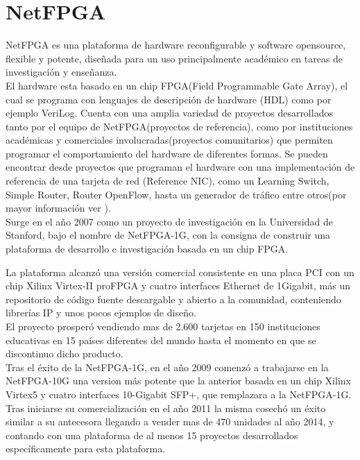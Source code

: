 \section{NetFPGA}
\label{section2.9}

NetFPGA\cite{NetFPGA1} es una plataforma de hardware reconfigurable y software opensource, flexible y potente, diseñada para un uso principalmente académico en tareas de investigación y enseñanza.\\

El hardware esta basado en un chip FPGA(Field Programmable Gate Array), el cual se programa con lenguajes de descripci\'on de hardware (HDL) como por ejemplo VeriLog. Cuenta con una amplia variedad de proyectos desarrollados tanto por el equipo de NetFPGA(proyectos de referencia), como por instituciones académicas y comerciales involucradas(proyectos comunitarios) que permiten programar el comportamiento del hardware  de diferentes formas. Se pueden encontrar desde proyectos que programan el hardware con una implementación de referencia de una tarjeta de red (Reference NIC), como un Learning Switch, Simple Router, Router OpenFlow, hasta un generador de tr\'afico entre otros(por mayor informaci\'on ver \citep{NetFPGA2}).\\ 

Surge en el año 2007 como un proyecto de investigación en la Universidad de Stanford, bajo el nombre de NetFPGA-1G, con la consigna de construir una plataforma de desarrollo e investigación basada en un chip FPGA.
 
La plataforma alcanz\'o una versi\'on comercial consistente en una placa PCI con un chip Xilinx Virtex-II proFPGA y cuatro interfaces Ethernet de 1Gigabit, m\'as un repositorio de código fuente descargable y abierto a la comunidad, conteniendo librerías IP y unos pocos ejemplos de diseño.\\

El proyecto prosper\'o vendiendo mas de 2.600 tarjetas en 150 instituciones educativas en 15 países diferentes del mundo hasta el momento en que se discontinuo dicho producto.\\

Tras el éxito de la NetFPGA-1G, en el año 2009 comenzó a trabajarse en la NetFPGA-10G una version m\'as potente que la  anterior basada en un chip Xilinx Virtex5 y cuatro interfaces 10-Gigabit SFP+, que remplazara a la NetFPGA-1G. Tras iniciarse su comercialización en el año 2011 la misma cosech\'o un éxito similar a su antecesora llegando a vender mas de 470 unidades al año 2014, y contando con una plataforma de al menos 15 proyectos desarrollados específicamente para esta plataforma.\\

